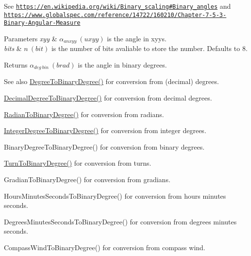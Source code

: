 See \href{https://en.wikipedia.org/wiki/Binary_scaling#Binary_angles}{\tt https\+://en.\+wikipedia.\+org/wiki/\+Binary\+\_\+scaling\#\+Binary\+\_\+angles} and \href{https://www.globalspec.com/reference/14722/160210/Chapter-7-5-3-Binary-Angular-Measure}{\tt https\+://www.\+globalspec.\+com/reference/14722/160210/\+Chapter-\/7-\/5-\/3-\/\+Binary-\/\+Angular-\/\+Measure} 
\begin{DoxyParams}{Parameters}
{\em xyy} & $\alpha_{anxyy}\ (uxyy)$ is the angle in xyys. \\
\hline
{\em bits} & $n\ (bit)$ is the number of bits avaliable to store the number. Defaults to 8. \\
\hline
\end{DoxyParams}
\begin{DoxyReturn}{Returns}
$\alpha_{deg\ bin}\ (brad)$ is the angle in binary degrees. 
\end{DoxyReturn}
\begin{DoxySeeAlso}{See also}
\mbox{\hyperlink{group___e_g_x_math-_angle_conversions-_degree_gacd1e3dc5194e89426a899a7cac4874f8}{Degree\+To\+Binary\+Degree()}} for conversion from (decimal) degrees. 

\mbox{\hyperlink{group___e_g_x_math-_angle_conversions-_decimal_degree_gaceec7ae7988c7f342d0b0fa6940720a1}{Decimal\+Degree\+To\+Binary\+Degree()}} for conversion from decimal degrees. 

\mbox{\hyperlink{group___e_g_x_math-_angle_conversions-_radian_ga13311d9b6977d514f1d6c336e7c0162b}{Radian\+To\+Binary\+Degree()}} for conversion from radians. 

\mbox{\hyperlink{group___e_g_x_math-_angle_conversions-_integer_degree_ga694bbfe624c3c14e97ce6155ca9bc44d}{Integer\+Degree\+To\+Binary\+Degree()}} for conversion from integer degrees. 

Binary\+Degree\+To\+Binary\+Degree() for conversion from binary degrees. 

\mbox{\hyperlink{group___e_g_x_math-_angle_conversions-_turn_ga678efb8f5c3958351fc3f1dfaf117b28}{Turn\+To\+Binary\+Degree()}} for conversion from turns. 

Gradian\+To\+Binary\+Degree() for conversion from gradians. 

Hours\+Minutes\+Seconds\+To\+Binary\+Degree() for conversion from hours minutes seconds. 

Degrees\+Minutes\+Seconds\+To\+Binary\+Degree() for conversion from degrees minutes seconds. 

Compass\+Wind\+To\+Binary\+Degree() for conversion from compass wind. 
\end{DoxySeeAlso}
\mbox{\label{group___e_g_x_math-_angle_conversions-_x_z_x_gae450293733efffff773e954627860bf0}} 
